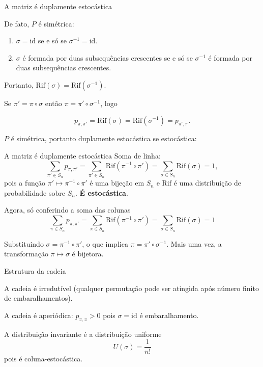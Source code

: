 \documentclass{beamer}
\begin{document}
\begin{frame}{A matriz é duplamente estocástica} 

  De fato, $P$ é simétrica:

  \vfill

  \begin{enumerate}
  \item $\sigma=\mathrm{id}$ se e só se  $\sigma^{-1}=\mathrm{id}$.
  \item $\sigma$ é formada por duas subsequências crescentes se e só se
    $\sigma^{-1}$ é formada por duas subsequências crescentes.
  \end{enumerate}
  
  
  \vfill
  
  Portanto, $\mathrm{Rif}(\sigma)= \mathrm{Rif}(\sigma^{-1})$.
  
  \vfill

  Se $\pi' = \pi\circ\sigma$ então $\pi=\pi'\circ \sigma^{-1}$, logo

  $$
  p_{\pi,\pi'} = \mathrm{Rif}(\sigma) = \mathrm{Rif}(\sigma^{-1}) = p_{\pi',\pi} .
  $$

  \vfill
  
  $P$ é simétrica, portanto duplamente estocástica se estocástica:
   \end{frame}
\begin{frame}{A matriz é duplamente estocástica} 
  Soma de linha:
  \[
    \sum_{\pi' \in S_n} p_{\pi, \pi'}
    = \sum_{\pi' \in S_n} \mathrm{Rif}(\pi^{-1} \circ \pi')
    = \sum_{\sigma \in S_n} \mathrm{Rif}(\sigma) = 1,
  \]
  pois a função \(\pi' \mapsto \pi^{-1} \circ \pi'\) é uma bijeção em
  \(S_n\) e \(\mathrm{Rif}\) é uma distribuição de probabilidade sobre
  \(S_n\). \textbf{É estocástica}.
  
  \vfill
  
  Agora, só conferindo a soma das colunas 
  \[
    \sum_{\pi \in S_n} p_{\pi, \pi'} = \sum_{\pi \in S_n}
    \mathrm{Rif}(\pi^{-1} \circ \pi')= \sum_{\sigma \in S_n}
    \mathrm{Rif}(\sigma) = 1
  \]
  
  Substituindo \(\sigma = \pi^{-1} \circ \pi'\), o que implica
  \(\pi = \pi' \circ \sigma^{-1}\).  Mais uma vez, a transformação
  \(\pi \mapsto \sigma\) é bijetora.
\end{frame}
\begin{frame}{Estrutura da cadeia}

  \vfill
  
  A cadeia é irredutível (qualquer permutação pode ser atingida após
  número finito de embaralhamentos).

  \vfill
  
  A cadeia é aperiódica: $p_{\pi,\pi}> 0$ pois $\sigma=\mathrm{id}$ é
  embaralhamento.

  \vfill
  
  A distribuição invariante é a distribuição uniforme
  \[
    U(\sigma) = \frac{1}{n!}
  \]
  pois é coluna-estocástica.
\end{frame}
\end{document}
